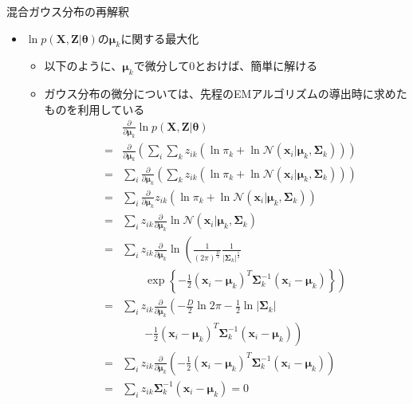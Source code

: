 \documentclass[dvipdfmx,notheorems,t]{beamer}
\begin{document}
\begin{frame}{混合ガウス分布の再解釈}

\begin{itemize}
	\item $\ln p(\bm{X}, \bm{Z} | \bm{\theta})$の$\bm{\mu}_k$に関する最大化
	\begin{itemize}
		\item 以下のように、$\bm{\mu}_k$で微分して$0$とおけば、簡単に解ける
		\item ガウス分布の微分については、先程のEMアルゴリズムの導出時に求めたものを利用している
		\begin{eqnarray}
			&& \frac{\partial}{\partial \bm{\mu}_k} \ln p(\bm{X}, \bm{Z} | \bm{\theta}) \nonumber \\
			&=& \frac{\partial}{\partial \bm{\mu}_k} \left( \sum_i \sum_k z_{ik} \left( \ln \pi_k + \ln \mathcal{N}(\bm{x}_i | \bm{\mu}_k, \bm{\Sigma}_k) \right) \right) \nonumber \\
			&=& \sum_i \frac{\partial}{\partial \bm{\mu}_k} \left( \sum_k z_{ik} \left( \ln \pi_k + \ln \mathcal{N}(\bm{x}_i | \bm{\mu}_k, \bm{\Sigma}_k) \right) \right) \nonumber \\
			&=& \sum_i \frac{\partial}{\partial \bm{\mu}_k} z_{ik} \left( \ln \pi_k + \ln \mathcal{N}(\bm{x}_i | \bm{\mu}_k, \bm{\Sigma}_k) \right) \nonumber \\
			&=& \sum_i z_{ik} \frac{\partial}{\partial \bm{\mu}_k} \ln \mathcal{N}(\bm{x}_i | \bm{\mu}_k, \bm{\Sigma}_k) \nonumber \\
			&=& \sum_i z_{ik} \frac{\partial}{\partial \bm{\mu}_k} \ln \left( \frac{1}{(2\pi)^\frac{D}{2}} \frac{1}{|\bm{\Sigma}_k|^\frac{1}{2}} \right. \nonumber \\
			&& \qquad \left. \exp \left\{ -\frac{1}{2} \left( \bm{x}_i - \bm{\mu}_k \right)^T \bm{\Sigma}_k^{-1} \left( \bm{x}_i - \bm{\mu}_k \right) \right\} \right) \nonumber \\
			&=& \sum_i z_{ik} \frac{\partial}{\partial \bm{\mu}_k} \left( -\frac{D}{2} \ln 2\pi - \frac{1}{2} \ln |\bm{\Sigma}_k| \right. \nonumber \\
			&& \qquad \left. - \frac{1}{2} \left( \bm{x}_i - \bm{\mu}_k \right)^T \bm{\Sigma}_k^{-1} \left( \bm{x}_i - \bm{\mu}_k \right) \right) \nonumber \\
			&=& \sum_i z_{ik} \frac{\partial}{\partial \bm{\mu}_k} \left( - \frac{1}{2} \left( \bm{x}_i - \bm{\mu}_k \right)^T \bm{\Sigma}_k^{-1} \left( \bm{x}_i - \bm{\mu}_k \right) \right) \nonumber \\
			&=& \sum_i z_{ik} \bm{\Sigma}_k^{-1} (\bm{x}_i - \bm{\mu}_k) = 0

\end{eqnarray}
\end{itemize}
\end{itemize}
\end{frame}
\end{document}
